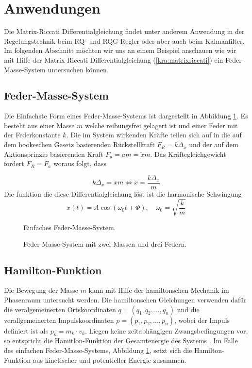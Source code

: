 \section{Anwendungen \label{kra:section:anwendung}}
\newcommand{\dt}[0]{\frac{d}{dt}}

Die Matrix-Riccati Differentialgleichung findet unter anderem Anwendung in der Regelungstechnik beim RQ- und RQG-Regler oder aber auch beim Kalmanfilter.
Im folgenden Abschnitt möchten wir uns an einem Beispiel anschauen wie wir mit Hilfe der Matrix-Riccati Differentialgleichung (\ref{kra:matrixriccati}) ein Feder-Masse-System untersuchen können.

\subsection{Feder-Masse-System}
Die Einfachste Form eines Feder-Masse-Systems ist dargestellt in Abbildung \ref{kra:fig:simple_mass_spring}.
Es besteht aus einer Masse $m$ welche reibungsfrei gelagert ist und einer Feder mit der Federkonstante $k$.
Die im System wirkenden Kräfte teilen sich auf in die auf dem hookeschen Gesetz basierenden Rückstellkraft $F_R = k \Delta_x$ und der auf dem Aktionsprinzip basierenden Kraft $F_a = am = \ddot{x} m$.
Das Kräftegleichgewicht fordert $F_R = F_a$ woraus folgt, dass

\begin{equation*}
    k \Delta_x = \ddot{x} m \Leftrightarrow \ddot{x} = \frac{k \Delta_x}{m}
\end{equation*}
Die funktion die diese Differentialgleichung löst ist die harmonische Schwingung
\begin{equation}
    x(t) = A \cos(\omega_0 t + \Phi), \quad \omega_0 = \sqrt{\frac{k}{m}}
\end{equation}


\begin{figure}
    
    \caption{Einfaches Feder-Masse-System.}
    \label{kra:fig:simple_mass_spring}
\end{figure}

\begin{figure}
    
    \caption{Feder-Masse-System mit zwei Massen und drei Federn.}
    \label{kra:fig:multi_mass_spring}
\end{figure}


\subsection{Hamilton-Funktion}
Die Bewegung der Masse $m$ kann mit Hilfe der hamiltonschen Mechanik im Phasenraum untersucht werden.
Die hamiltonschen Gleichungen verwenden dafür die veralgemeinerten Ortskoordinaten
$q = (q_{1}, q_{2}, ..., q_{n})$ und die verallgemeinerten Impulskoordinaten $p = (p_{1}, p_{2}, ..., p_{n})$, wobei der Impuls definiert ist als $p_k = m_k \cdot v_k$.
Liegen keine zeitabhängigen Zwangsbedingungen vor, so entspricht die Hamitlon-Funktion der Gesamtenergie des Systems \cite{kra:hamilton}.
Im Falle des einfachen Feder-Masse-Systems, Abbildung \ref{kra:fig:simple_mass_spring}, setzt sich die Hamilton-Funktion aus kinetischer und potentieller Energie zusammen.

